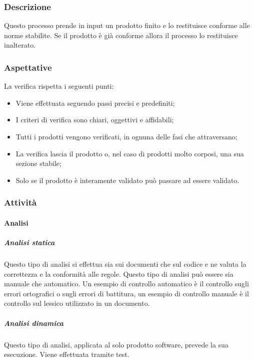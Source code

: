\documentclass[../norme_di_progetto.tex]{subfiles}
\begin{document}
\subsubsection{Descrizione}
Questo processo prende in input un prodotto finito e lo restituisce conforme alle norme stabilite. Se il prodotto è già conforme allora il processo lo restituisce inalterato.

\subsubsection{Aspettative}
La verifica rispetta i seguenti punti:
\begin{itemize}
    \item Viene effettuata seguendo passi precisi e predefiniti;
    \item I criteri di verifica sono chiari, oggettivi e affidabili;
    \item Tutti i prodotti vengono verificati, in ognuna delle fasi che attraversano;
    \item La verifica lascia il prodotto o, nel caso di prodotti molto corposi, una sua sezione stabile;
    \item Solo se il prodotto è interamente validato può passare ad essere validato.
\end{itemize}

\subsubsection{Attività}
\paragraph{Analisi}
\subparagraph{Analisi statica}
Questo tipo di analisi si effettua sia sui documenti che sul codice e ne valuta la correttezza e la conformità alle regole. Questo tipo di analisi può essere sia manuale che automatico. Un esempio di controllo automatico è il controllo sugli errori ortografici o sugli errori di battitura, un esempio di controllo manuale è il controllo sul lessico utilizzato in un documento.
\subparagraph{Analisi dinamica}
Questo tipo di analisi, applicata al solo prodotto software, prevede la sua esecuzione. Viene effettuata tramite test.
\end{document}
